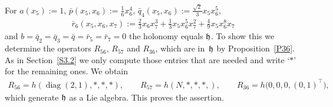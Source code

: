 \documentclass[11pt]{article}
\numberwithin{equation}{section}
\newcommand\fh{{\frak h}}
\newcommand{\diag}{\operatorname{diag}}
\begin{document}
\begin{Example}\label{Ex37}
For $a(x_5):=1$, $\bar p(x_5,x_6):=\frac16 x_6^4$, $\bar q_4(x_5,x_6):=\frac {\sqrt2}3x_5 x_6^5$, \begin{gather*}\bar r_6(x_5,x_6,x_7):= \tfrac23 x_6 x_7^3+\tfrac13 x_5x_6^5 x_7^2+\tfrac 49 x_5x_6^8x_7 \end{gather*}
and $b=\bar q_2=\bar q_3 =\bar q=\bar r_5= \bar r_7=0$ the holonomy equals $\fh$. To show this we determine the operators $R_{56}$, $R_{57}$ and $R_{36}$, which are in~$\fh$ by Proposition~\ref{P36}. As in Section~\ref{S3.2} we only compute those entries that are needed and write `$*$' for the remaining ones. We obtain
\begin{gather*}R_{56}=h(\diag(2,1), *,*,*),\qquad R_{57}=h(N,*,*,*,),\qquad R_{36}=h\big(0,0,0,(0,1)^\top\big),\end{gather*}
which generate $\fh$ as a Lie algebra. This proves the assertion.
\end{Example}
\end{document}
